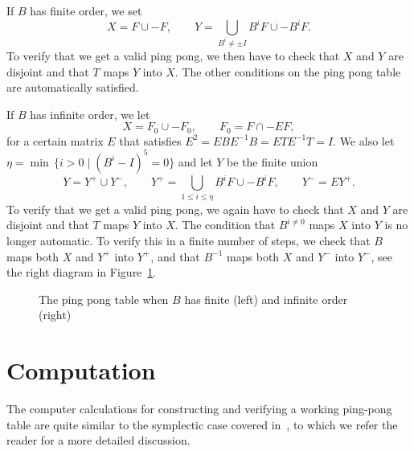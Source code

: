 \documentclass[11pt,a4paper]{amsart}
\theoremstyle{definition}
\theoremstyle{definition}
\numberwithin{equation}{section}
\begin{document}
If $B$ has finite order, we set
\[X=F\cup -F,\qquad Y=\bigcup_{B^i\neq\pm I}B^i F\cup -B^i F.\]
To verify that we get a valid ping pong, we then have to check that $X$ and $Y$ are disjoint and that $T$ maps $Y$ into $X$. The other conditions on the ping pong table are automatically satisfied.

If $B$ has infinite order, we let
\[X=F_0\cup -F_0,\qquad F_0=F\cap -EF,\]
for a certain matrix $E$ that satisfies $E^2=EBE^{-1}B=ETE^{-1}T=I$. We also let $\eta=\min\,\{i>0\mid (B^i-I)^5=0\}$ and let $Y$ be the finite union
\[Y=Y^+\cup Y^-,\qquad Y^+=\bigcup_{1\leq i\leq\eta}B^i F\cup -B^i F,\qquad Y^-=EY^+.\]
To verify that we get a valid ping pong, we again have to check that $X$ and $Y$ are disjoint and that $T$ maps $Y$ into $X$. The condition that $B^{i\neq 0}$ maps $X$ into $Y$ is no longer automatic. To verify this in a finite number of steps, we check that $B$ maps both $X$ and $Y^+$ into $Y^+$, and that $B^{-1}$ maps both $X$ and $Y^-$ into $Y^-$, see the right diagram in Figure~\ref{fig:ping-pong}.


\begin{figure}[htbp]
\begin{minipage}{12cm}
\centering
{}
\caption{The ping pong table when $B$ has finite (left) and infinite order (right)}\label{fig:ping-pong}
\end{minipage}
\end{figure}


\section{Computation}
The computer calculations for constructing and verifying a working ping-pong table are quite similar to the symplectic case covered in~\cite{BDN21}, to which we refer the reader for a more detailed discussion.
\end{document}
